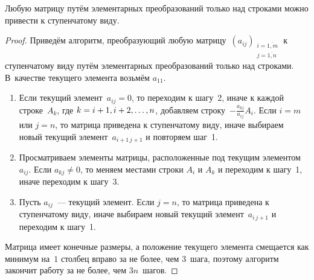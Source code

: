 \begin{theorem}
Любую матрицу путём элементарных преобразований только над строками можно привести к ступенчатому виду.
\end{theorem}
\begin{proof}
Приведём алгоритм, преобразующий любую матрицу~$(a_{ij})_{\begin{smallmatrix}
i = \overline{1,m} \\
j = \overline{1,n}
\end{smallmatrix}}$ к ступенчатому виду путём элементарных преобразований только над строками.
В~качестве текущего элемента возьмём $a_{11}$.
\begin{enumerate}
	\item Если текущий элемент~$a_{ij} = 0$, то переходим к шагу~2, иначе к каждой строке~$A_k$, где $k \opbr= i + 1, i + 2, \ldots, n$, добавляем строку~$-\frac{a_{kj}}{a_{ij}} A_i$.
	Если $i = m$ или $j = n$, то матрица приведена к ступенчатому виду, иначе выбираем новый текущий элемент~$a_{i+1\, j+1}$ и повторяем шаг~1.
	\item Просматриваем элементы матрицы, расположенные под текущим элементом~$a_{ij}$.
	Если $a_{kj} \neq 0$, то меняем местами строки $A_i$ и $A_k$ и переходим к шагу~1, иначе переходим к шагу~3.
	\item Пусть $a_{ij}$~--- текущий элемент.
	Если $j = n$, то матрица приведена к ступенчатому виду, иначе выбираем новый текущий элемент~$a_{i\, j + 1}$ и переходим к шагу~1.
\end{enumerate}

Матрица имеет конечные размеры, а положение текущего элемента смещается как минимум на~$1$ столбец вправо за не более, чем $3$~шага, поэтому алгоритм закончит работу за не более, чем $3n$~шагов.
\end{proof}